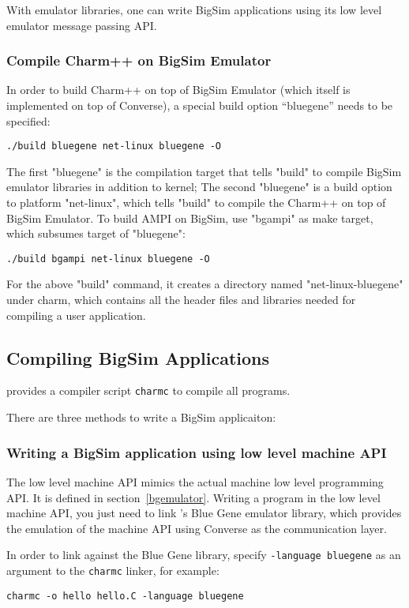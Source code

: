 With emulator libraries, one can write BigSim applications using its
low level emulator message passing API.

\subsubsection{Compile Charm++ on BigSim Emulator}

In order to build Charm++ on top of BigSim Emulator (which itself is 
implemented on top of Converse), a special build option ``bluegene''
needs to be specified:
\begin{verbatim}
./build bluegene net-linux bluegene -O
\end{verbatim}

The first "bluegene" is the compilation target that tells "build" to
compile BigSim emulator libraries in addition to \charmpp{} kernel;
The second "bluegene" is a build option to platform "net-linux", which tells
"build" to compile the Charm++ on top of BigSim Emulator. 
To build AMPI on BigSim, use "bgampi" as make target, which subsumes target
of "bluegene":
\begin{verbatim}
./build bgampi net-linux bluegene -O
\end{verbatim}

For the above "build" command, it creates a directory named 
"net-linux-bluegene" under charm, which contains all the header files and
libraries needed for compiling a user application.

\subsection{Compiling BigSim Applications}

\charmpp{} provides a compiler script {\tt charmc} to compile all programs.

There are three methods to write a BigSim applicaiton:

\subsubsection{Writing a BigSim application using low level machine API}
The low level machine API mimics the actual machine low level programming
API. It is defined in section~\ref{bgemulator}. Writing a program in the 
low level machine API, you just need to link \charmpp{}'s Blue Gene emulator
library, which provides the emulation of the machine API using Converse as
the communication layer.

In order to link against the Blue Gene library, specify 
\texttt{-language bluegene} as an argument to the {\tt charmc} linker, 
for example:
\begin{verbatim}
charmc -o hello hello.C -language bluegene
\end{verbatim}

